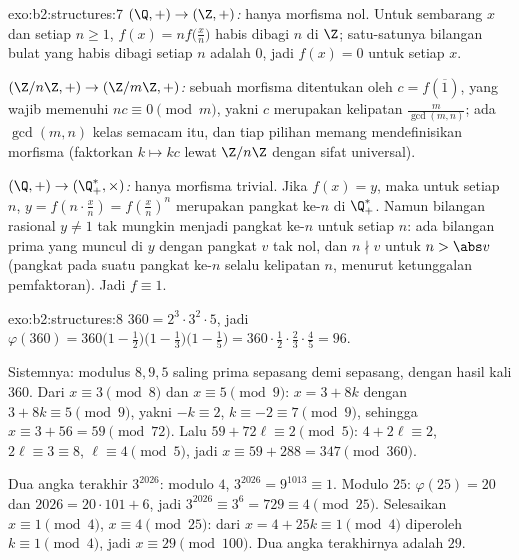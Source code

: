\begin{solution}{exo:b2:structures:7}
\emph{$(\Q,+) \to (\Z,+)$:} hanya morfisma nol. Untuk sembarang $x$ dan
setiap $n \geq 1$, $f(x) = n f\bigl(\frac xn\bigr)$ habis dibagi
$n$ di $\Z$; satu-satunya bilangan bulat yang habis dibagi setiap $n$
adalah $0$, jadi $f(x) = 0$ untuk setiap $x$.

\emph{$(\Z/n\Z, +) \to (\Z/m\Z, +)$:} sebuah morfisma ditentukan oleh
$c = f(\overline 1)$, yang wajib memenuhi $n c \equiv 0 \pmod m$,
yakni $c$ merupakan kelipatan $\frac{m}{\gcd(m,n)}$; ada
$\gcd(m,n)$ kelas semacam itu, dan tiap pilihan memang mendefinisikan
morfisma (faktorkan $k \mapsto kc$ lewat $\Z/n\Z$ dengan sifat universal).

\emph{$(\Q, +) \to (\Q_+^*, \times)$:} hanya morfisma trivial. Jika
$f(x) = y$, maka untuk setiap $n$, $y = f(n \cdot \frac xn) =
f(\frac xn)^n$ merupakan pangkat ke-$n$ di $\Q_+^*$. Namun bilangan
rasional $y \neq 1$ tak mungkin menjadi pangkat ke-$n$ untuk setiap $n$:
ada bilangan prima yang muncul di $y$ dengan pangkat $v$ tak nol, dan $n
\nmid v$ untuk $n > \abs v$ (pangkat pada suatu pangkat ke-$n$ selalu
kelipatan $n$, menurut ketunggalan pemfaktoran). Jadi $f \equiv 1$.
\end{solution}

\begin{solution}{exo:b2:structures:8}
$360 = 2^3 \cdot 3^2 \cdot 5$, jadi
$\varphi(360) = 360\bigl(1 - \tfrac12\bigr)\bigl(1 -
\tfrac13\bigr)\bigl(1 - \tfrac15\bigr) = 360 \cdot \tfrac12 \cdot
\tfrac23 \cdot \tfrac45 = 96$.

Sistemnya: modulus $8, 9, 5$ saling prima sepasang demi sepasang, dengan
hasil kali $360$. Dari $x \equiv 3 \pmod 8$ dan $x \equiv 5 \pmod 9$:
$x = 3 + 8k$ dengan $3 + 8k \equiv 5 \pmod 9$, yakni $-k \equiv 2$, $k
\equiv -2 \equiv 7 \pmod 9$, sehingga $x \equiv 3 + 56 = 59 \pmod{72}$.
Lalu $59 + 72\ell \equiv 2 \pmod 5$: $4 + 2\ell \equiv 2$, $2\ell \equiv
3 \equiv 8$, $\ell \equiv 4 \pmod 5$, jadi $x \equiv 59 + 288 = 347 \pmod{360}$.

Dua angka terakhir $3^{2026}$: modulo $4$, $3^{2026} = 9^{1013} \equiv
1$. Modulo $25$: $\varphi(25) = 20$ dan $2026 = 20\cdot101 + 6$, jadi
$3^{2026} \equiv 3^6 = 729 \equiv 4 \pmod{25}$. Selesaikan $x \equiv 1
\pmod 4$, $x \equiv 4 \pmod{25}$: dari $x = 4 + 25k \equiv 1 \pmod 4$
diperoleh $k \equiv 1 \pmod 4$, jadi $x \equiv 29 \pmod{100}$. Dua angka
terakhirnya adalah $29$.
\end{solution}

